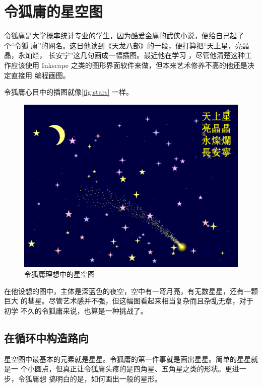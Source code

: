 
\chapter{令狐庸的星空图}
\label{chap:stars}

令狐庸是大学概率统计专业的学生，因为酷爱金庸的武侠小说，便给自己起了个“令狐
庸”的网名。这日他读到《天龙八部》的一段，便打算把“天上星，亮晶晶，永灿烂，
长安宁”这几句画成一幅插图。最近他在学习 \Asy{}，尽管他清楚这种工作应该使用
Inkscape 之类的图形界面软件来做，但本来艺术修养不高的他还是决定直接用 \Asy{} 
编程画图。

令狐庸心目中的插图就像\autoref{fig:stars} 一样。
\begin{figure}[htpb]
  \centering
  \includegraphics{stars.pdf}
  \caption{令狐庸理想中的星空图}
  \label{fig:stars}
\end{figure}

在他设想的图中，主体是深蓝色的夜空，空中有一弯月亮，有无数星星，还有一颗巨大
的彗星。尽管艺术感并不强，但这幅图看起来相当复杂而且杂乱无章，对于初学 \Asy{}
不久的令狐庸来说，也算是一种挑战了。

\section{在循环中构造路向}
\label{sec:guideinloop}

星空图中最基本的元素就是星星。令狐庸的第一件事就是画出星星。简单的星星就是一
个小圆点，但真正让令狐庸头疼的是四角星、五角星之类的形状。更进一步，令狐庸想
搞明白的是，如何画出一般的星形。

